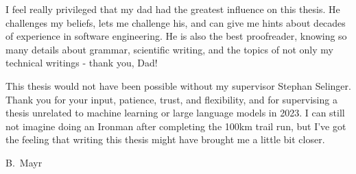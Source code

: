 I feel really privileged that my dad had the greatest influence on this thesis.
He challenges my beliefs, lets me challenge his, and can give me hints about decades of experience in software engineering.
He is also the best proofreader, knowing so many details about grammar, scientific writing, and the topics of not only my technical writings - thank you, Dad!

This thesis would not have been possible without my supervisor Stephan Selinger.
Thank you for your input, patience, trust, and flexibility, and for supervising a thesis unrelated to machine learning or large language models in 2023.
I can still not imagine doing an Ironman after completing the 100km trail run, but I've got the feeling that writing this thesis might have brought me a little bit closer.

\vspace{6ex}
\noindent
B.\ Mayr